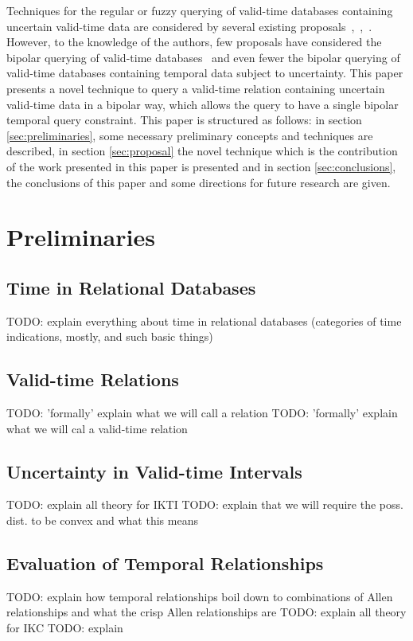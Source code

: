 \documentclass[runningheads,a4paper]{llncs}
\begin{document}
Techniques for the regular or fuzzy querying of valid-time databases containing uncertain valid-time data are considered by several existing proposals~\cite{Pons2012ijcis},~\cite{Pons2012ipmu},~\cite{Pons2013ijufkbs}. However, to the knowledge of the authors, few proposals have considered the bipolar querying of valid-time databases~\cite{Billiet2011fqas} and even fewer the bipolar querying of valid-time databases containing temporal data subject to uncertainty. This paper presents a novel technique to query a valid-time relation containing uncertain valid-time data in a bipolar way, which allows the query to have a single bipolar temporal query constraint. This paper is structured as follows: in section \ref{sec:preliminaries}, some necessary preliminary concepts and techniques are described, in section \ref{sec:proposal} the novel technique which is the contribution of the work presented in this paper is presented and in section \ref{sec:conclusions}, the conclusions of this paper and some directions for future research are given.


\section{Preliminaries\label{sec:preliminaries}}

\subsection{Time in Relational Databases}
TODO: explain everything about time in relational databases (categories of time indications, mostly, and such basic things)

\subsection{Valid-time Relations}
TODO: 'formally' explain what we will call a relation
TODO: 'formally' explain what we will cal a valid-time relation

\subsection{Uncertainty in Valid-time Intervals}
TODO: explain all theory for IKTI
TODO: explain that we will require the poss. dist. to be convex and what this means

\subsection{Evaluation of Temporal Relationships}
TODO: explain how temporal relationships boil down to combinations of Allen relationships and what the crisp Allen relationships are
TODO: explain all theory for IKC
TODO: explain 
\end{document}
